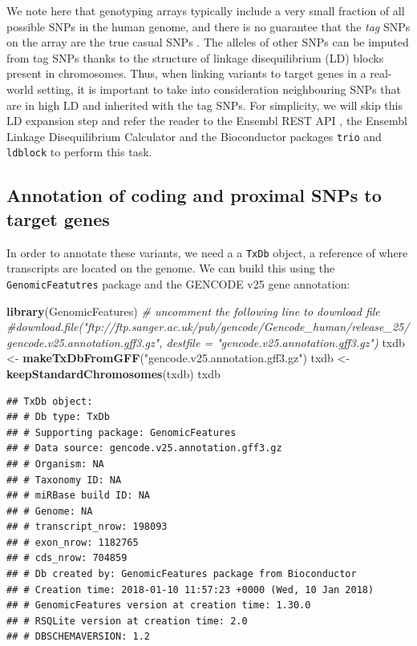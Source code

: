 \documentclass[9pt,a4paper,]{extarticle}
\newenvironment{Shaded}{\begin{snugshade}}{\end{snugshade}}
\newcommand{\KeywordTok}[1]{\textcolor[rgb]{0.13,0.29,0.53}{\textbf{#1}}}
\newcommand{\StringTok}[1]{\textcolor[rgb]{0.31,0.60,0.02}{#1}}
\newcommand{\CommentTok}[1]{\textcolor[rgb]{0.56,0.35,0.01}{\textit{#1}}}
\newcommand{\NormalTok}[1]{#1}
\begin{document}
We note here that genotyping arrays typically include a very small fraction of all possible SNPs in the human genome, and there is no guarantee that the \emph{tag} SNPs on the array are the true casual SNPs \citep{Bush2012}.
The alleles of other SNPs can be imputed from tag SNPs thanks to the structure of linkage disequilibrium (LD) blocks present in chromosomes.
Thus, when linking variants to target genes in a real-world setting, it is important to take into consideration neighbouring SNPs that are in high LD and inherited with the tag SNPs.
For simplicity, we will skip this LD expansion step and refer the reader to the Ensembl REST API \citep{Yates2015, Ensembl2017a}, the Ensembl Linkage Disequilibrium Calculator \citep{Ensembl2017b} and the Bioconductor packages \texttt{trio} \citep{Schwender2015} and \texttt{ldblock} \citep{Carey2017c} to perform this task.

\subsection{Annotation of coding and proximal SNPs to target genes}\label{annotation-of-coding-and-proximal-snps-to-target-genes}

In order to annotate these variants, we need a a \texttt{TxDb} object, a reference of where transcripts are located on the genome.
We can build this using the \texttt{GenomicFeatutres} \citep{Lawrence2013} package and the GENCODE v25 gene annotation:

\begin{Shaded}
\begin{Highlighting}[]
\KeywordTok{library}\NormalTok{(GenomicFeatures)}
\CommentTok{# uncomment the following line to download file}
\CommentTok{#download.file("ftp://ftp.sanger.ac.uk/pub/gencode/Gencode_human/release_25/gencode.v25.annotation.gff3.gz", destfile = "gencode.v25.annotation.gff3.gz")}
\NormalTok{txdb <-}\StringTok{ }\KeywordTok{makeTxDbFromGFF}\NormalTok{(}\StringTok{"gencode.v25.annotation.gff3.gz"}\NormalTok{)}
\NormalTok{txdb <-}\StringTok{ }\KeywordTok{keepStandardChromosomes}\NormalTok{(txdb)}
\NormalTok{txdb}
\end{Highlighting}
\end{Shaded}

\begin{verbatim}
## TxDb object:
## # Db type: TxDb
## # Supporting package: GenomicFeatures
## # Data source: gencode.v25.annotation.gff3.gz
## # Organism: NA
## # Taxonomy ID: NA
## # miRBase build ID: NA
## # Genome: NA
## # transcript_nrow: 198093
## # exon_nrow: 1182765
## # cds_nrow: 704859
## # Db created by: GenomicFeatures package from Bioconductor
## # Creation time: 2018-01-10 11:57:23 +0000 (Wed, 10 Jan 2018)
## # GenomicFeatures version at creation time: 1.30.0
## # RSQLite version at creation time: 2.0
## # DBSCHEMAVERSION: 1.2
\end{verbatim}
\end{document}
